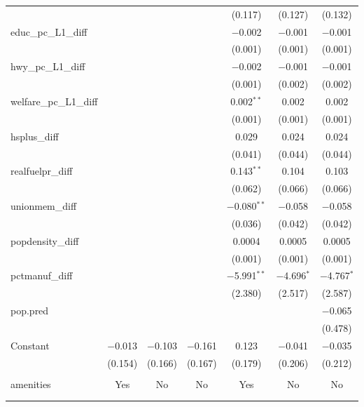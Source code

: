 \begin{table}[!htbp]
\begin{tabular}{@{\extracolsep{5pt}}lcccccc}
  &  &  &  & (0.117) & (0.127) & (0.132) \\ 
  educ\_pc\_L1\_diff &  &  &  & $-$0.002 & $-$0.001 & $-$0.001 \\ 
  &  &  &  & (0.001) & (0.001) & (0.001) \\ 
  hwy\_pc\_L1\_diff &  &  &  & $-$0.002 & $-$0.001 & $-$0.001 \\ 
  &  &  &  & (0.001) & (0.002) & (0.002) \\ 
  welfare\_pc\_L1\_diff &  &  &  & 0.002$^{**}$ & 0.002 & 0.002 \\ 
  &  &  &  & (0.001) & (0.001) & (0.001) \\ 
  hsplus\_diff &  &  &  & 0.029 & 0.024 & 0.024 \\ 
  &  &  &  & (0.041) & (0.044) & (0.044) \\ 
  realfuelpr\_diff &  &  &  & 0.143$^{**}$ & 0.104 & 0.103 \\ 
  &  &  &  & (0.062) & (0.066) & (0.066) \\ 
  unionmem\_diff &  &  &  & $-$0.080$^{**}$ & $-$0.058 & $-$0.058 \\ 
  &  &  &  & (0.036) & (0.042) & (0.042) \\ 
  popdensity\_diff &  &  &  & 0.0004 & 0.0005 & 0.0005 \\ 
  &  &  &  & (0.001) & (0.001) & (0.001) \\ 
  pctmanuf\_diff &  &  &  & $-$5.991$^{**}$ & $-$4.696$^{*}$ & $-$4.767$^{*}$ \\ 
  &  &  &  & (2.380) & (2.517) & (2.587) \\ 
  pop.pred &  &  &  &  &  & $-$0.065 \\ 
  &  &  &  &  &  & (0.478) \\ 
  Constant & $-$0.013 & $-$0.103 & $-$0.161 & 0.123 & $-$0.041 & $-$0.035 \\ 
  & (0.154) & (0.166) & (0.167) & (0.179) & (0.206) & (0.212) \\ 
 \hline \\[-1.8ex] 
amenities & Yes & No & No & Yes & No & No \\ 
\hline \\[-1.8ex] 
\hline 
\hline \\[-1.8ex] 
\end{tabular} 
\end{table} 
